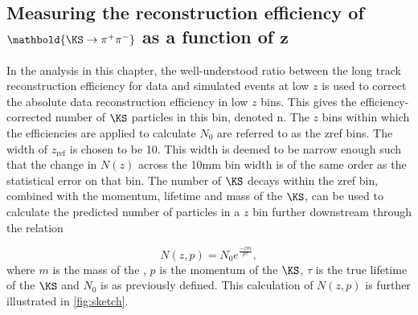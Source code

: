 \subsection[{Measuring the reconstruction efficiency of $\KS\to\pi^{+}\pi^{-}$ as a function of $z$}]{Measuring the reconstruction efficiency of $\mathbold{\KS\to\pi^{+}\pi^{-}}$ as a function of $\mathbold{z}$}
\label{sec:methodintro}


In the analysis in this chapter, the well-understood ratio between the long track reconstruction efficiency for data and simulated events at low $z$ is used to correct the absolute data reconstruction efficiency in low $z$ bins. This gives the efficiency-corrected number of $\KS$ particles in this bin, denoted \gls{n}. The $z$ bins within which the efficiencies are applied to calculate $N_{0}$ are referred to as the \gls{zref} bins. The width of $z_{\textrm{ref}}$ is chosen to be 10\mm. This width is deemed to be narrow enough such that the change in $N(z)$ across the 10mm bin width is of the same order as the statistical error on that bin. The number of $\KS$ decays within the \gls{zref} bin, combined with the momentum, lifetime and mass of the $\KS$, can be used to calculate the predicted number of \KS particles in a $z$ bin further downstream through the relation

\begin{equation}
  N(z,p) = N_{0} e ^{\frac{-zm}{p\tau }},
  \label{eq:extra}
\end{equation}
where $m$ is the mass of the \KS, $p$ is the momentum of the $\KS$, $\tau$ is the true lifetime of the $\KS$ and $N_{0}$ is as previously defined. This calculation of $N(z,p)$ is further illustrated in \autoref{fig:sketch}.

